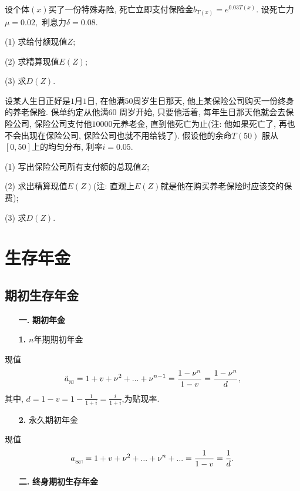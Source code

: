\documentclass[a4paper,openany, 10pt]{ctexbook}
\makeatletter
\newcommand{\hei}{\CJKfamily{hei}}      %
\DeclareRobustCommand{\annu}[1]{_{%
    \def\arraystretch{0}%
    \setlength\arraycolsep{1pt}%
    \setlength\arrayrulewidth{.2pt}%
    \begin{array}[b]{@{}c|}\hline
        \\[\arraycolsep]%
        \scriptstyle #1%
    \end{array}%
}}
\makeatother
\begin{document}
\begin{exs}
    设个体$(x)$买了一份特殊寿险, 死亡立即支付保险金$b_{T(x)}=e^{0.03T(x)}.$ 设死亡力$\mu=0.02,$ 利息力$\delta=0.08.$

    (1) 求给付额现值$Z;$

    (2) 求精算现值$E(Z);$

    (3) 求$D(Z).$
\end{exs}

\begin{exs}
    设某人生日正好是$1$月$1$日, 在他满$50$周岁生日那天, 他上某保险公司购买一份终身的养老保险. 保单约定从他满$60$ 周岁开始, 只要他活着, 每年生日那天他就会去保险公司, 保险公司支付他$10000$元养老金, 直到他死亡为止(注: 他如果死亡了, 再也不会出现在保险公司, 保险公司也就不用给钱了). 假设他的余命$T(50)$ 服从$[0,50]$上的均匀分布, 利率$i=0.05.$

    (1) 写出保险公司所有支付额的总现值$Z$;

    (2) 求出精算现值$E(Z)$(注: 直观上$E(Z)$就是他在购买养老保险时应该交的保费);

    (3) 求$D(Z).$
\end{exs}


\chapter{生存年金}
\section{期初生存年金}
\begin{itemize}
    \item[{\bf\hei 一.}]{\bf\hei 期初年金}
\end{itemize}

\begin{itemize}
    \item[{\bf\hei 1.}]$n$年期期初年金
\end{itemize}

\noindent 现值$$\ddot a_{\annu n}=1+v+\nu^2+...+\nu^{n-1}=\frac{1-\nu^n}{1-v}=\frac{1-\nu^n}{d},$$
其中, $d=1-v=1-\frac{1}{1+i}=\frac{i}{1+i}$,为贴现率.
\begin{itemize}
    \item[{\bf\hei 2.}]永久期初年金
\end{itemize}
现值$$a_{\annu {\infty}}=1+v+\nu^2+...+\nu^n+...=\frac{1}{1-v}=\frac{1}{d}.$$
\begin{itemize}
    \item[{\bf\hei 二.}]{\bf\hei 终身期初生存年金}
\end{itemize}
\end{document}
